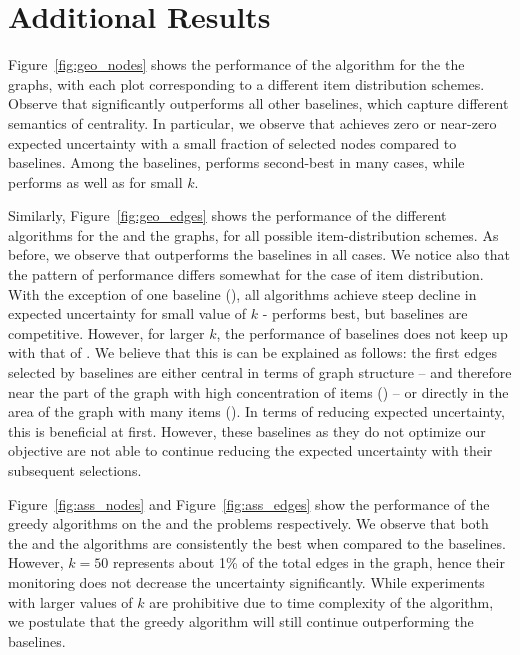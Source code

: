 \section{Additional Results}
\label{sec:additional_results}
Figure~\ref{fig:geo_nodes}
shows the performance of the {\nodegreedy} algorithm for the 
the {\geo} graphs, with each plot corresponding to a different item
distribution schemes.
Observe that {\nodegreedy} significantly outperforms
all other baselines, which capture different semantics of centrality.
In particular, we observe that {\nodegreedy} achieves zero or near-zero
expected uncertainty with a small fraction of selected nodes compared to baselines.
Among the baselines, {\closeness} performs second-best in many cases,
while {\indegree} performs as well as {\closeness} for small $k$.

Similarly, Figure~\ref{fig:geo_edges} shows the 
performance of the different algorithms for the {\edgeproblem} and the {\geo} 
graphs, for all
possible item-distribution schemes.
As before, we observe that {\edgegreedy} outperforms the baselines in all 
cases. We notice also that the pattern of performance differs somewhat for the 
case of {\ego} item distribution. With the exception of one 
baseline ({\probability}), all algorithms achieve steep decline in expected uncertainty for
small value of $k$ - {\edgegreedy} performs best, but baselines are competitive. 
However, for larger $k$, the performance of baselines  
does not keep up with that of {\edgegreedy}.
We believe that this is can be explained as follows:
the first edges selected by 
baselines are either central in terms of graph structure 
-- and therefore near the part of the graph with high concentration of items 
({\edgebetweenness}) -- or directly in the area of the graph with many items 
({\edgenumitems}). 
In terms of reducing expected uncertainty, this is beneficial at first. However, these baselines
as they do not optimize our objective are not able to continue reducing the expected
uncertainty with their subsequent selections.

Figure~\ref{fig:ass_nodes} and Figure~\ref{fig:ass_edges} show the performance of 
the greedy algorithms on the {\nodeproblem} and the {\edgeproblem} problems
respectively. We observe that both the {\nodegreedy} and the {\edgegreedy} algorithms
are consistently the best when compared to the baselines. However, $k=50$ represents
about 1\% of the total edges in the graph, hence their monitoring does not decrease
the uncertainty significantly.
While experiments with larger values of $k$ are prohibitive due to time complexity of the {\edgegreedy} algorithm, we postulate that the greedy algorithm will still continue
outperforming the baselines.


